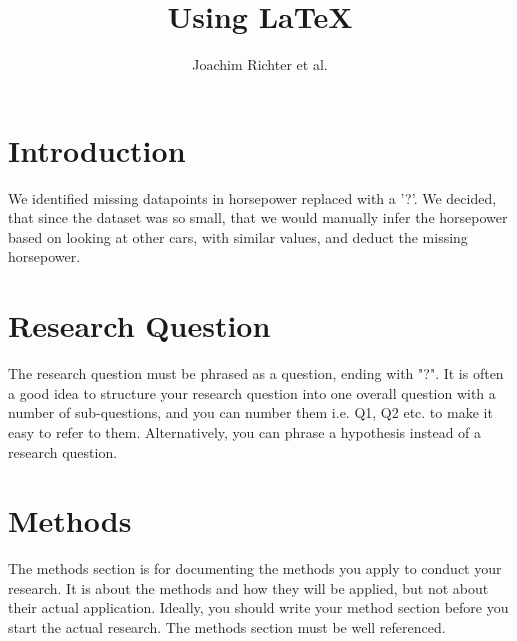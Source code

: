 \documentclass[a4paper, twocolumn]{article}
\author{Joachim Richter et al.}
\title{Using \LaTeX}
\begin{document}


\section{Introduction\label{sec:Introduction}}

We identified missing datapoints in horsepower replaced with a '?'. 
We decided, that since the dataset was so small, that we would manually infer the horsepower based on looking at other cars, with similar values, and deduct the missing horsepower. 

\section{Research Question\label{sec:Research Question}}

The research question must be phrased as a question, ending with "?".
It is often a good idea to structure your research question into one overall question with a number of sub-questions, and you can number them i.e. Q1, Q2 etc. to make it easy to refer to them.
Alternatively, you can phrase a hypothesis instead of a research question.

\section{Methods\label{sec:Methods}}

The methods section is for documenting the methods you apply to conduct your research.
It is about the methods and how they will be applied, but not about their actual application.
Ideally, you should write your method section before you start the actual research.
The methods section must be well referenced.
\end{document}
